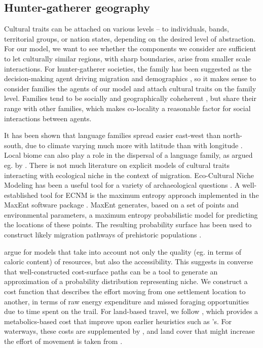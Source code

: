 \documentclass[a4paper,12pt]{scrartcl}
\begin{document}
\subsection{Hunter-gatherer geography}
\label{s:geography}
Cultural traits can be attached on various levels – to individuals, bands,
territorial groups, or nation states, depending on the desired level of
abstraction. For our model, we want to see whether the components we consider
are sufficient to let culturally similar regions, with sharp boundaries, arise
from smaller scale interactions. For hunter-gatherer societies, the family has
been suggested as the decision-making agent driving migration and demographics
\parencite{}, so it makes sense to consider families the agents of our model and
attach cultural traits on the family level. Families tend to be socially and
geographically coheherent \textcite{}, but share their range with other
families, which makes co-locality a reasonable factor for social interactions
between agents.

It has been shown that language families spread easier east-west than
north-south, due to climate varying much more with latitude than with longitude
\parencite{}. Local biome can also play a role in the dispersal of a language
family, as argued eg. by \textcite{grollemund2015bantu,ehret2015bantu}. There is
not much literature on explicit models of cultural traits interacting with
ecological niche in the context of migration. Eco-Cultural Niche Modeling
\parencite[ECNM]{banks2006ecocultural} has been a useful tool for a variety of
archaeological questions
\cite{banks2008human,banks2013ecological,dalpoimguedes2014modeling,kondo2018ecological,walker2019persistence}.
A well-established tool for ECNM is the maximum entropy approach implemented in
the MaxEnt software package
\cite{phillips2006maximum,phillips2008modeling,maxenttutorial}. MaxEnt
generates, based on a set of points and environmental parameters, a maximum
entropy probabilistic model for predicting the locations of these points. The
resulting probability surface has been used to construct likely migration
pathways of prehistoric populations \cite{kondo2018ecological}.

\Textcite{steele2003where} argue for models that take into account not only the
quality (eg. in terms of caloric content) of resources, but also the
accessibility. This suggests in converse that well-constructed cost-surface
paths can be a tool to generate an approximation of a probability distribution
representing niche. We construct a cost function that describes the effort
moving from one settlement location to another, in terms of raw energy
expenditure and missed foraging opportunities due to time spent on the trail.
For land-based travel, we follow \textcite{wood2006energetically}, which
provides a metabolics-based cost that improve upon earlier heuristics such as
\textcite{tobler1993three}'s. For waterways, these costs are supplemented by
\textcite{livingood2012no}, and land cover that might increase the effort of
movement is taken from \cite{white2012geospatial}.
\end{document}
